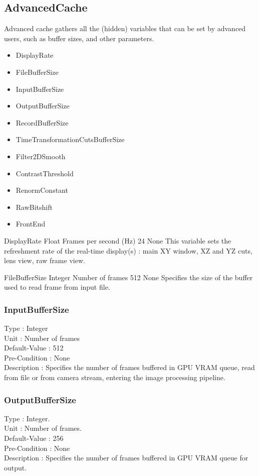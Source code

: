 
\subsection{AdvancedCache}

Advanced cache gathers all the (hidden) variables that can be set by advanced users, such as buffer sizes, and other parameters.
\begin{itemize}
    \item DisplayRate
    \item FileBufferSize
    \item InputBufferSize
    \item OutputBufferSize
    \item RecordBufferSize
    \item TimeTransformationCutsBufferSize
    \item Filter2DSmooth
    \item ContrastThreshold
    \item RenormConstant
    \item RawBitshift
    \item FrontEnd
\end{itemize}

\entryparam
    {DisplayRate}
    {Float}
    {Frames per second (Hz)}
    {24}
    {None}
    {This variable sets the refreshment rate of the real-time display(s) : main XY window, XZ and YZ cuts, lens view, raw frame view.}

\entryparam
    {FileBufferSize}
    {Integer}
    {Number of frames}
    {512}
    {None}
    {Specifies the size of the buffer used to read frame from input file.}

\subsubsection{InputBufferSize}
\noindent
Type : Integer\\
Unit : Number of frames\\
Default-Value : 512\\
Pre-Condition :  None\\
Description : Specifies the number of frames buffered in GPU VRAM queue, read from file or from camera stream, entering the image processing pipeline.\\

\subsubsection{OutputBufferSize}
\noindent
Type : Integer.\\
Unit : Number of frames.\\
Default-Value : 256\\
Pre-Condition : None\\
Description : Specifies the number of frames buffered in GPU VRAM queue for output.\\

